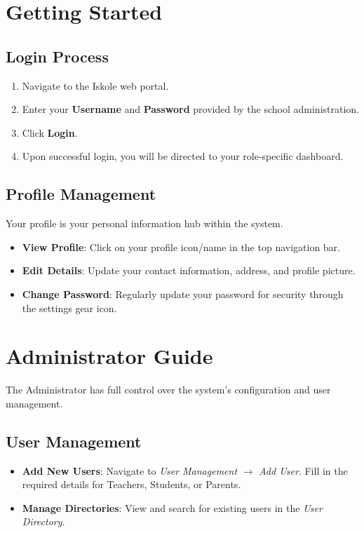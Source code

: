 \documentclass[12pt, a4paper]{report}
\begin{document}
\chapter{Getting Started}

\section{Login Process}
\begin{enumerate}
    \item Navigate to the Iskole web portal.
    \item Enter your \textbf{Username} and \textbf{Password} provided by the school administration.
    \item Click \textbf{Login}.
    \item Upon successful login, you will be directed to your role-specific dashboard.
\end{enumerate}

\section{Profile Management}
Your profile is your personal information hub within the system.
\begin{itemize}
    \item \textbf{View Profile}: Click on your profile icon/name in the top navigation bar.
    \item \textbf{Edit Details}: Update your contact information, address, and profile picture.
    \item \textbf{Change Password}: Regularly update your password for security through the settings gear icon.
\end{itemize}

\chapter{Administrator Guide}
The Administrator has full control over the system's configuration and user management.

\section{User Management}
\begin{itemize}
    \item \textbf{Add New Users}: Navigate to \textit{User Management} $\rightarrow$ \textit{Add User}. Fill in the required details for Teachers, Students, or Parents.
    \item \textbf{Manage Directories}: View and search for existing users in the \textit{User Directory}.
\end{itemize}
\end{document}
